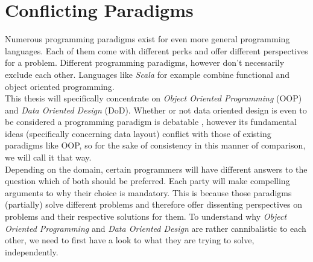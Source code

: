 \chapter{Conflicting Paradigms}
Numerous programming paradigms exist for even more general programming languages. Each of them come with different perks and offer different perspectives for a problem. Different programming paradigms, however don't necessarily exclude each other. Languages like \textit{Scala} for example combine functional and object oriented programming.\\
This thesis will specifically concentrate on \textit{Object Oriented Programming} (OOP) and \textit{Data Oriented Design} (DoD). Whether or not data oriented design is even to be considered a programming paradigm is debatable , however its fundamental ideas (specifically concerning data layout) conflict with those of existing paradigms like OOP, so for the sake of consistency in this manner of comparison, we will call it that way.\\ 
Depending on the domain, certain programmers will have different answers to the question which of both should be preferred. Each party will make compelling arguments to why their choice is mandatory. This is because those paradigms (partially) solve different problems and therefore offer dissenting perspectives on problems and their respective solutions for them.
To understand why \textit{Object Oriented Programming} and \textit{Data Oriented Design} are rather cannibalistic to each other, we need to first have a look to what they are trying to solve, independently.

